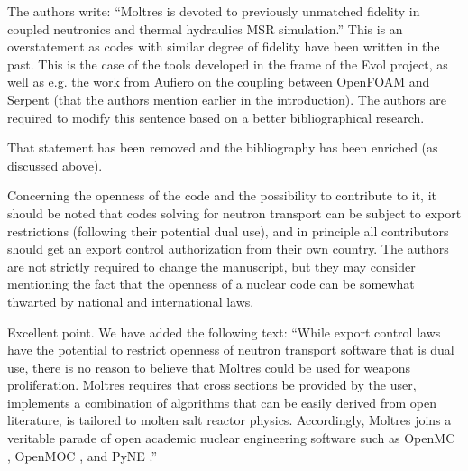 \documentclass[answers,11pt]{exam}
\begin{document}
\begin{questions}
\question The authors write:
``Moltres is devoted to previously unmatched fidelity in coupled neutronics and 
        thermal hydraulics MSR simulation.''
This is an overstatement as codes with similar degree of fidelity have been written in the past. This is the case of the tools developed in the frame of the Evol project, as well as e.g. the work from Aufiero on the coupling between OpenFOAM and Serpent (that the authors mention earlier in the introduction). The authors are required to modify this sentence based on a better bibliographical research.
\begin{solution}
        That statement has been removed and the bibliography has been enriched 
        (as discussed above).
\end{solution}

\question Concerning the openness of the code and the possibility to contribute to it, it should be noted that codes solving for neutron transport can be subject to export restrictions (following their potential dual use), and in principle all contributors should get an export control authorization from their own country. The authors are not strictly required to change the manuscript, but they may consider mentioning the fact that the openness of a nuclear code can be somewhat thwarted by national and international laws.
\begin{solution}
	Excellent point. We have added the following text: ``While export
control laws have the potential to restrict openness of neutron transport
software that is dual use, there is no reason to believe that Moltres could be
used for weapons proliferation.  Moltres requires that cross sections be
provided by the user, implements a combination of algorithms that can be easily
derived from open literature, is tailored to molten salt reactor physics.
Accordingly, Moltres joins a veritable parade of open academic nuclear
engineering software such as OpenMC \cite{romano_openmc:_2015},
OpenMOC \cite{boyd_openmoc_2014}, and
PyNE \cite{bates_pyne_2014,biondo_quality_2014}.'' 

\end{solution}


\end{questions}
\end{document}
